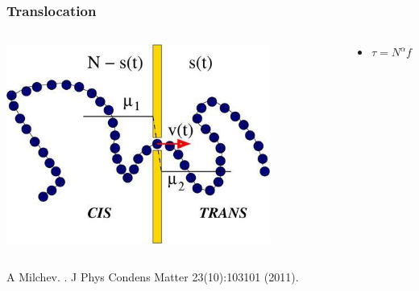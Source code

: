 \documentclass{beamer}
\begin{document}
 
\frame %
{
  \frametitle{Translocation}
 

\begin{columns}
 \begin{column}{0.8\textwidth}
\begin{center}
  \includegraphics[width=0.8\textwidth]{translocation.jpg} 
 \end{center}
\end{column}
\begin{column}{0.2\textwidth}

 \begin{center}
\begin{itemize}
\item<2->{ $\tau = N^\alpha f^{-\delta}$}
\end{itemize}


\end{center}
 
\end{column}
\end{columns}

\vfill
{\tiny

\usebibitemtemplate{\color{structure}\insertbiblabel} 
\usebibliographyblocktemplate{\color{structure}}{\color{black}}{\color{structure!75}}{\color{structure!75}} 

\begin{thebibliography}{} 
A Milchev. 
. 
\newblock J Phys Condens Matter 23(10):103101 (2011). 

\end{thebibliography} }
}
\end{document}
